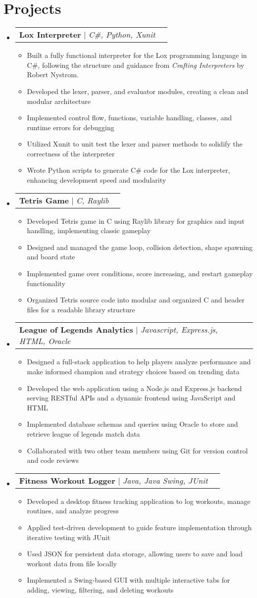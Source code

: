 \documentclass[letterpaper,11pt]{article}
\makeatletter
\newcommand{\resumeItem}[1]{
  \item\small{
    {#1 \vspace{-2pt}}
  }
}
\newcommand{\resumeProjectHeading}[2]{
    \item
    \begin{tabular*}{0.97\textwidth}{l@{\extracolsep{\fill}}r}
      \small#1 & #2 \\
    \end{tabular*}\vspace{-7pt}
}
\newcommand{\resumeSubHeadingListStart}{\begin{itemize}[leftmargin=0.15in, label={}]}
\newcommand{\resumeSubHeadingListEnd}{\end{itemize}}
\newcommand{\resumeItemListStart}{\begin{itemize}}
\newcommand{\resumeItemListEnd}{\end{itemize}\vspace{-5pt}}
\makeatother
\begin{document}
\section{Projects}
\resumeSubHeadingListStart

\resumeProjectHeading
{\textbf{Lox Interpreter} $|$ \emph{C\#, Python, Xunit}}{}
\resumeItemListStart
\resumeItem{Built a fully functional interpreter for the Lox programming language in C\#, following the structure and guidance from \emph{Crafting Interpreters} by Robert Nystrom.}
\resumeItem{Developed the lexer, parser, and evaluator modules, creating a clean and modular architecture}
\resumeItem{Implemented control flow, functions, variable handling, classes, and runtime errors for debugging}
\resumeItem{Utilized Xunit to unit test the lexer and parser methods to solidify the correctness of the interpreter}
\resumeItem{Wrote Python scripts to generate C\# code for the Lox interpreter, enhancing development speed and modularity}
\resumeItemListEnd

\resumeProjectHeading
{\textbf{Tetris Game} $|$ \emph{C, Raylib}}{}
\resumeItemListStart
\resumeItem{Developed Tetris game in C using Raylib library for graphics and input handling, implementing classic gameplay}
\resumeItem{Designed and managed the game loop, collision detection, shape spawning and board state}
\resumeItem{Implemented game over conditions, score increasing, and restart gameplay functionality}
\resumeItem{Organized Tetris source code into modular and organized C and header files for a readable library structure}

\resumeItemListEnd

\resumeProjectHeading
{\textbf{League of Legends Analytics} $|$ \emph{Javascript, Express.js, HTML, Oracle}}{}
\resumeItemListStart
\resumeItem{Designed a full-stack application to help players analyze performance and make informed champion and strategy choices based on trending data}
\resumeItem{Developed the web application using a Node.js and Express.js backend serving RESTful APIs and a dynamic frontend using JavaScript and HTML}
\resumeItem{Implemented database schemas and queries using Oracle to store and retrieve league of legends match data}
\resumeItem{Collaborated with two other team members using Git for version control and code reviews}
\resumeItemListEnd
\resumeProjectHeading
{\textbf{Fitness Workout Logger} $|$ \emph{Java, Java Swing, JUnit}}{}
\resumeItemListStart
\resumeItem{Developed a desktop fitness tracking application to log workouts, manage routines, and analyze progress}
\resumeItem{Applied test-driven development to guide feature implementation through iterative testing with JUnit}
\resumeItem{Used JSON for persistent data storage, allowing users to save and load workout data from file locally}
\resumeItem{Implemented a Swing-based GUI with multiple interactive tabs for adding, viewing, filtering, and deleting workouts}
\resumeItemListEnd
\resumeSubHeadingListEnd
\end{document}
